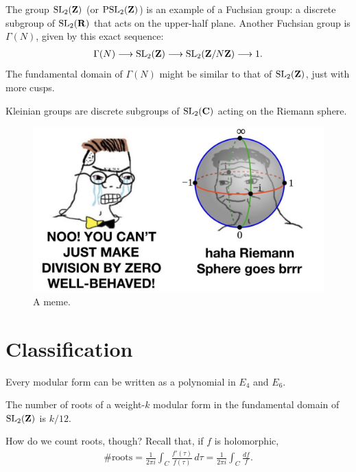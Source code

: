\documentclass[11pt, oneside,margin=1in]{article}
\begin{document}
\begin{remark}
	The group $\operatorname{SL}_{2}(\mathbf Z)$ (or $\operatorname{PSL}_{2}(\mathbf Z)$) is an example of a {Fuchsian group}: a discrete subgroup of $\operatorname{SL}_{2}(\mathbf R)$ that acts on the upper-half plane. Another Fuchsian group is $\Gamma(N)$, given by this exact sequence:
	\begin{align*}
		\Gamma(N)  \longrightarrow \operatorname{SL}_{2}(\mathbf Z)  \longrightarrow \operatorname{SL}_{2}(\mathbf Z/N\mathbf Z)  \longrightarrow 1.
	\end{align*}
	The fundamental domain of $\Gamma(N)$ might be similar to that of $\operatorname{SL}_{2}(\mathbf Z)$, just with more cusps.

	Kleinian groups are discrete subgroups of $\operatorname{SL}_{2}(\mathbf C)$ acting on the Riemann sphere.
\end{remark}

\begin{figure}
	\begin{center}
		\includegraphics[scale=0.3]{riemann_sphere}
		\caption{A meme.}
	\end{center}
\end{figure}

\section{Classification}
Every modular form can be written as a polynomial in $E_4$ and $E_6$. 
\begin{lemma}[ ]\label{}\text{}
The number of roots of a weight-$k$ modular form in the fundamental domain of $\operatorname{SL}_{2}(\mathbf Z)$ is $k/12$.
\end{lemma}
\iffalse
How do we count roots, though? Recall that, if $f$ is holomorphic, 
\begin{align*}
	\#\textrm{roots} = \frac{1}{2\pi i}\int_{C}^{} \frac{f'(\tau)}{f(\tau)}  \, d\tau = \frac{1}{2\pi i} \int_{C}^{} \frac{df}{f}. 
\end{align*}
\end{document}
